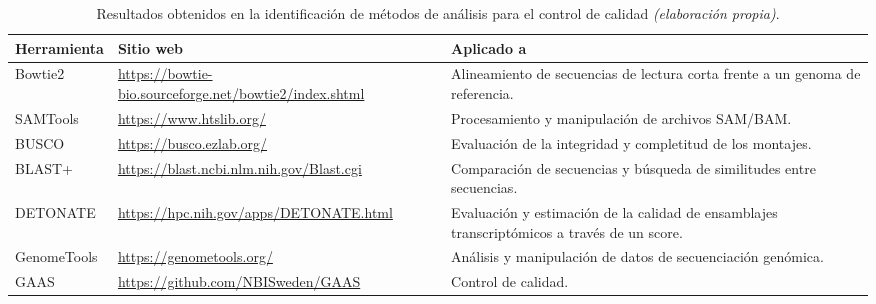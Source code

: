 \documentclass[12pt]{article}
\begin{document}
\newpage

\begin{table}[htbp]
    \centering
    \caption{Resultados obtenidos en la identificación de métodos de análisis para el control de calidad \emph{(elaboración propia)}.}
    \label{tabla:control_calidad}
    \begin{tabularx}{\textwidth}{|p{3cm}|X|X|}
        \hline
        \textbf{Herramienta} & \textbf{Sitio web} & \textbf{Aplicado a} \\
        \hline
        Bowtie2 & \href{https://bowtie-bio.sourceforge.net/bowtie2/index.shtml}{\url{https://bowtie-bio.sourceforge.net/bowtie2/index.shtml}} & Alineamiento de secuencias de lectura corta frente a un genoma de referencia. \\
        \hline
        SAMTools & \href{https://www.htslib.org/}{\url{https://www.htslib.org/}} & Procesamiento y manipulación de archivos SAM/BAM. \\
        \hline
        BUSCO & \href{https://busco.ezlab.org/}{\url{https://busco.ezlab.org/}} & Evaluación de la integridad y completitud de los montajes. \\
        \hline
        BLAST+ & \href{https://blast.ncbi.nlm.nih.gov/Blast.cgi}{\url{https://blast.ncbi.nlm.nih.gov/Blast.cgi}} & Comparación de secuencias y búsqueda de similitudes entre secuencias. \\
        \hline
        DETONATE & \href{https://hpc.nih.gov/apps/DETONATE.html}{\url{https://hpc.nih.gov/apps/DETONATE.html}} & Evaluación y estimación de la calidad de ensamblajes transcriptómicos a través de un score. \\
        \hline
        GenomeTools & \href{https://genometools.org/}{\url{https://genometools.org/}} & Análisis y manipulación de datos de secuenciación genómica. \\
        \hline
        GAAS & \href{https://github.com/NBISweden/GAAS}{\url{https://github.com/NBISweden/GAAS}} & Control de calidad. \\
        \hline
    \end{tabularx}
\end{table}
\end{document}
